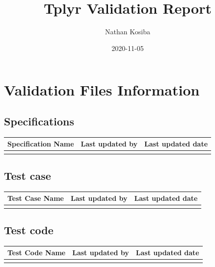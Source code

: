 \documentclass[
]{article}
\title{Tplyr Validation Report}
\author{Nathan Kosiba}
\date{2020-11-05}
\begin{document}
\maketitle

\newpage
\tableofcontents
\newpage

\hypertarget{validation-files-information}{%
\section{Validation Files
Information}\label{validation-files-information}}

\hypertarget{specifications}{%
\subsection{Specifications}\label{specifications}}

\begin{table}[H]
\centering
\begin{tabular}{lll}
\toprule
Specification Name & Last updated by & Last updated date\\
\midrule
\cellcolor{gray!6}{specification.Rmd} & \cellcolor{gray!6}{Nathan Kosiba} & \cellcolor{gray!6}{2020-11-05}\\
\bottomrule
\end{tabular}
\end{table}

\hypertarget{test-case}{%
\subsection{Test case}\label{test-case}}

\begin{table}[H]
\centering
\begin{tabular}{lll}
\toprule
Test Case Name & Last updated by & Last updated date\\
\midrule
\cellcolor{gray!6}{test\_cases.Rmd} & \cellcolor{gray!6}{Nathan Kosiba} & \cellcolor{gray!6}{2020-11-05}\\
\bottomrule
\end{tabular}
\end{table}

\hypertarget{test-code}{%
\subsection{Test code}\label{test-code}}

\begin{table}[H]
\centering
\begin{tabular}{lll}
\toprule
Test Code Name & Last updated by & Last updated date\\
\midrule
\cellcolor{gray!6}{test\_cases.R} & \cellcolor{gray!6}{Nathan Kosiba} & \cellcolor{gray!6}{2020-11-05}\\
\bottomrule
\end{tabular}
\end{table}
\end{document}
